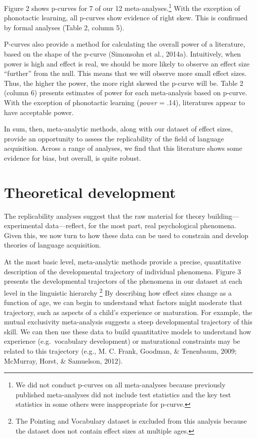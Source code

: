 \documentclass[english,floatsintext,man]{apa6}
\begin{document}
Figure 2 shows p-curves for 7 of our 12
meta-analyses.\footnote{We did not conduct p-curves on all meta-analyses because previously published meta-analyses did not include test statistics and the key test statistics in some others were inappropriate for p-curve. }
With the exception of phonotactic learning, all p-curves show evidence
of right skew. This is confirmed by formal analyses (Table 2, column 5).

P-curves also provide a method for calculating the overall power of a
literature, based on the shape of the p-curve (Simonsohn et al., 2014a).
Intuitively, when power is high and effect is real, we should be more
likely to observe an effect size \enquote{further} from the null. This
means that we will observe more small effect sizes. Thus, the higher the
power, the more right skewed the p-curve will be. Table 2 (column 6)
presents estimates of power for each meta-analysis based on p-curve.
With the exception of phonotactic learning (\emph{power} = .14),
literatures appear to have acceptable power.

In sum, then, meta-analytic methods, along with our dataset of effect
sizes, provide an opportunity to assess the replicability of the field
of language acquisition. Across a range of analyses, we find that this
literature shows some evidence for bias, but overall, is quite robust.

\section{Theoretical development}\label{theoretical-development}

The replicability analyses suggest that the raw material for theory
building---experimental data---reflect, for the most part, real
psychological phenomena. Given this, we now turn to how these data can
be used to constrain and develop theories of language acquisition.

At the most basic level, meta-analytic methods provide a precise,
quantitative description of the developmental trajectory of individual
phenomena. Figure 3 presents the developmental trajectors of the
phenomena in our dataset at each level in the linguistic hierarchy
\footnote{The Pointing and Vocabulary dataset is excluded from this analysis because the dataset does not contain effect sizes at multiple ages.}
By describing how effect sizes change as a function of age, we can begin
to understand what factors might moderate that trajectory, such as
aspects of a child's experience or maturation. For example, the mutual
exclusivity meta-analysis suggests a steep developmental trajectory of
this skill. We can then use these data to build quantitative models to
understand how experience (e.g.~vocabulary development) or maturational
constraints may be related to this trajectory (e.g., M. C. Frank,
Goodman, \& Tenenbaum, 2009; McMurray, Horst, \& Samuelson, 2012).
\end{document}
